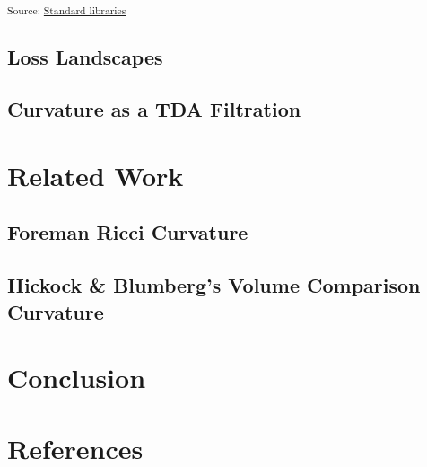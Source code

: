 \documentclass[
  letterpaper,
  DIV=11,
  numbers=noendperiod]{scrartcl}
\theoremstyle{plain}
\theoremstyle{plain}
\theoremstyle{definition}
\theoremstyle{plain}
\theoremstyle{definition}
\theoremstyle{remark}
\begin{document}
\textsubscript{Source:
\href{https://professorwug.github.io/diffusion-curvature//home/piriac/Pumberton/Workshop/21-SUMRY-Curvature/diffusion-curvature/nbs/experiments/2f-sign-prediction-tests.ipynb.html\#cell-fig-sadspheres}{Standard
libraries}}

\subsection{Loss Landscapes}\label{loss-landscapes}

\subsection{Curvature as a TDA
Filtration}\label{curvature-as-a-tda-filtration}

\section{Related Work}\label{related-work}

\subsection{Foreman Ricci Curvature}\label{foreman-ricci-curvature}

\subsection{Hickock \& Blumberg's Volume Comparison
Curvature}\label{hickock-blumbergs-volume-comparison-curvature}

\section{Conclusion}\label{conclusion}

\section*{References}\label{references}
\end{document}
